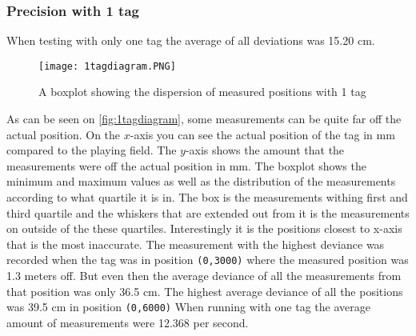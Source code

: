 \subsubsection{Precision with 1 tag} 
When testing with only one tag the average of all deviations was 15.20 cm.
\begin{figure}[H]
    \centering
    \texttt{[image: 1tagdiagram.PNG]}
    \caption{A boxplot showing the dispersion of measured positions with 1 tag}
    \label{fig:1tagdiagram}
\end{figure}
\noindent
As can be seen on \autoref{fig:1tagdiagram}, some measurements can be quite far off the actual position. 
On the $x$-axis you can see the actual position of the tag in mm compared to the playing field.
The $y$-axis shows the amount that the measurements were off the actual position in mm.
The boxplot shows the minimum and maximum values as well as the distribution of the measurements according to what quartile it is in.
The box is the measurements withing first and third quartile and the whiskers that are extended out from it is the measurements on outside of the these quartiles.
Interestingly it is the positions closest to x-axis that is the most inaccurate.
The measurement with the highest deviance was recorded when the tag was in position \texttt{(0,3000)} where the measured position was 1.3 meters off.
But even then the average deviance of all the measurements from that position was only 36.5 cm.
The highest average deviance of all the positions was 39.5 cm in position \texttt{(0,6000)}
When running with one tag the average amount of measurements were 12.368 per second.
 

